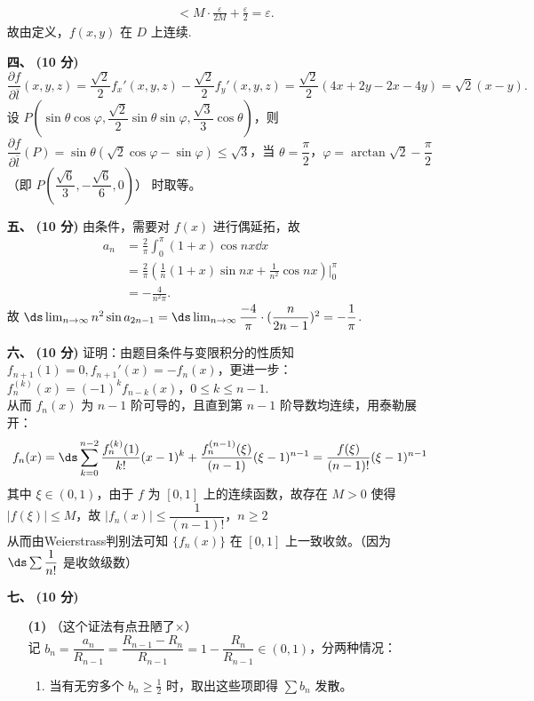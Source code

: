 \documentclass{ctexart}
\begin{document}
\begin{enumerate}
\begin{align*}
    &< M\cdot\frac{\varepsilon}{2M}+\frac{\varepsilon}{2}=\varepsilon.
    \end{align*}
    故由定义，$f(x,y)$ 在 $D$ 上连续.
    \item[\textbf{四、}] \textbf{(10 分)} \[\dfrac{\partial f}{\partial\overline{l}}(x,y,z)=\dfrac{\sqrt{2}}{2}f_x'(x,y,z)-\dfrac{\sqrt{2}}{2}f_y'(x,y,z)=\dfrac{\sqrt{2}}{2}(4x+2y-2x-4y)=\sqrt{2}(x-y).\]
    设 $P(\sin\theta\cos\varphi,\dfrac{\sqrt{2}}{2}\sin\theta\sin\varphi,\dfrac{\sqrt{3}}{3}\cos\theta)$，则 $\dfrac{\partial f}{\partial\overline{l}}(P)=\sin\theta(\sqrt{2}\cos\varphi-\sin\varphi)\le\sqrt{3}$，当 $\theta=\dfrac{\pi}{2}$，$\varphi=\arctan{\sqrt{2}}-\dfrac{\pi}{2}$（即 $P(\dfrac{\sqrt{6}}{3},-\dfrac{\sqrt{6}}{6},0)$） 时取等。
    \item[\textbf{五、}] \textbf{(10 分)} 由条件，需要对 $f(x)$ 进行偶延拓，故
    \begin{align*}
    a_n&=\frac{2}{\pi}\int_0^\pi(1+x)\cos{nx}\dd{x}\\
    &=\frac{2}{\pi}(\frac{1}{n}(1+x)\sin{nx}+\frac{1}{n^2}\cos{nx})\vert_0^\pi\\
    &=-\frac{4}{n^2\pi}.
    \end{align*}
    故 $\ds\lim_{n\to\infty}n^2\sin{a_{2n-1}}=\ds\lim_{n\to\infty}\dfrac{-4}{\pi}\cdot(\dfrac{n}{2n-1})^2=-\dfrac{1}{\pi}$.
    \item[\textbf{六、}] \textbf{(10 分)} 证明：由题目条件与变限积分的性质知 $f_{n+1}(1)=0,f_{n+1}'(x)=-f_n(x)$，更进一步：$f_n^{(k)}(x)=(-1)^kf_{n-k}(x)$，$0\le k\le n-1$. \\
    从而 $f_n(x)$ 为 $n-1$ 阶可导的，且直到第 $n-1$ 阶导数均连续，用泰勒展开：
    \[f_n(x)=\ds\sum_{k=0}^{n-2}\frac{f_n^{(k)}(1)}{k!}(x-1)^k+\frac{f_n^{(n-1)}(\xi)}{(n-1)}(\xi-1)^{n-1}=\frac{f(\xi)}{(n-1)!}(\xi-1)^{n-1}\]
    其中 $\xi\in(0,1)$，由于 $f$ 为 $[0,1]$ 上的连续函数，故存在 $M>0$ 使得 $|f(\xi)|\le M$，故 $|f_n(x)|\le\dfrac{1}{(n-1)!}$，$n\ge 2$ \\
    从而由Weierstrass判别法可知 $\{f_n(x)\}$ 在 $[0,1]$ 上一致收敛。（因为 $\ds\sum\dfrac{1}{n!}$ 是收敛级数）
    \item[\textbf{七、}] \textbf{(10 分)} 
    \begin{enumerate}
        \item[\textbf{(1)}] （这个证法有点丑陋了×）\\
        记 $b_n=\dfrac{a_n}{R_{n-1}}=\dfrac{R_{n-1}-R_n}{R_{n-1}}=1-\dfrac{R_n}{R_{n-1}}\in(0,1)$，分两种情况：
        \begin{enumerate}
            \item 当有无穷多个 $b_n\ge\frac{1}{2}$ 时，取出这些项即得 $\sum b_n$ 发散。

\end{enumerate}
\end{enumerate}
\end{enumerate}
\end{document}
